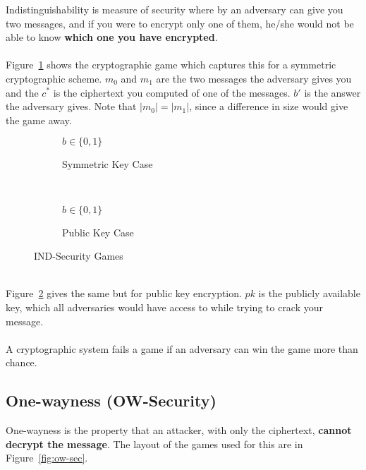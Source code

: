 Indistinguishability is measure of security where by an adversary can give you two messages, and if you were to encrypt only one of them, he/she would not be able to know \textbf{which one you have encrypted}.\\
\\
Figure~\ref{fig:ind-sec-sym} shows the cryptographic game which captures this for a symmetric cryptographic scheme. $m_0$ and $m_1$ are the two messages the adversary gives you and the $c^*$ is the ciphertext you computed of one of the messages. $b'$ is the answer the adversary gives. Note that $|m_0|=|m_1|$, since a difference in size would give the game away.\\
\begin{figure}[htp!]
    \centering
    \begin{subfigure}[b]{0.4\textwidth}
        \centering
        \begin{cryptogame}{$b\in \{0,1\}$}
        \end{cryptogame}
        \caption{Symmetric Key  Case}
        \label{fig:ind-sec-sym}
    \end{subfigure}
    ~
    \begin{subfigure}[b]{0.4\textwidth}
        \centering
        \begin{cryptogame}{$b\in \{0,1\}$}
        \end{cryptogame}
        \caption{Public Key Case}
        \label{fig:ind-sec-pub}
    \end{subfigure}
    \caption{IND-Security Games}
    \label{fig:ind-sec}
\end{figure}
\\
Figure~\ref{fig:ind-sec-pub} gives the same but for public key encryption. $pk$ is the publicly available key, which all adversaries would have access to while trying to crack your message.\\
\\
A cryptographic system fails a game if an adversary can win the game more than chance.

\subsection{One-wayness (OW-Security)}

One-wayness is the property that an attacker, with only the ciphertext, \textbf{cannot decrypt the message}. The layout of the games used for this are in Figure~\ref{fig:ow-sec}.

